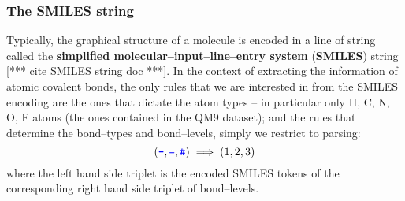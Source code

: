 \documentclass[12pt]{article}
\def\att{                    %
        \marginpar[ \hspace*{\fill} \raisebox{-0.2em}{\rule{2mm}{1.2em}} ]
        {\raisebox{-0.2em}{\rule{2mm}{1.2em}} }
        }
\def\at#1{[*** \att #1 ***]}  %
\begin{document}
\subsubsection{The SMILES string}
Typically, the graphical structure of a molecule is encoded in a line of string called the \textbf{simplified molecular--input--line--entry system} (\textbf{SMILES}) string \at{cite SMILES string doc}. 
In the context of extracting the information of atomic covalent bonds, the only rules that we are interested in from the SMILES encoding are the ones that dictate the atom types -- in particular only H, C, N, O, F atoms (the ones contained in the QM9 dataset); and the rules that determine the bond--types and bond--levels, simply we restrict to parsing:
\begin{equation*}
     (\codeword{-},\codeword{=},\codeword{#}) \implies (1, 2, 3)
\end{equation*}
where the left hand side triplet is the encoded SMILES tokens of the corresponding right hand side triplet of bond--levels.  
\end{document}
